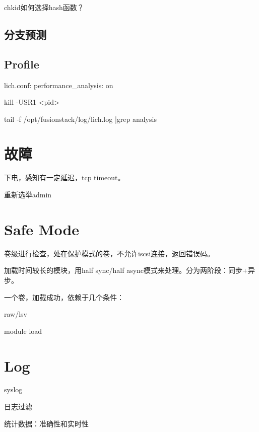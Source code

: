 chkid如何选择hash函数？

\subsection{分支预测}

\subsection{Profile}

lich.conf: performance\_analysis: on

kill -USR1 <pid>

tail -f /opt/fusionstack/log/lich.log |grep analysis

\section{故障}

下电，感知有一定延迟，tcp timeout。

重新选举admin

\section{Safe Mode}

卷级进行检查，处在保护模式的卷，不允许iscsi连接，返回错误码。

加载时间较长的模块，用half sync/half async模式来处理。分为两阶段：同步+异步。

一个卷，加载成功，依赖于几个条件：
\begin{compactitem}
    \item raw/lsv
    \item module load
\end{compactitem}

\section{Log}

syslog

日志过滤

统计数据：准确性和实时性
